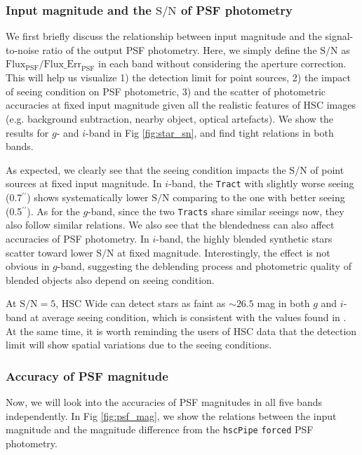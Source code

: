 \documentclass[useamsfonts]{pasj01}
\def\asec{$^{\prime\prime}$}
\def\hscpipe{\texttt{hscPipe}}
\def\forced{\texttt{forced}}
\def\tract{\texttt{Tract}}
\def\tracts{\texttt{Tracts}}
\def\s2n{{$\mathrm{S}/\mathrm{N}$}}
\begin{document}
\subsubsection{Input magnitude and the $\mathrm{S}/\mathrm{N}$ of PSF photometry}

    We first briefly discuss the relationship between input magnitude and the
    signal-to-noise ratio of the output PSF photometry.
    Here, we simply define the \s2n{} as
    $\mathrm{Flux}_{\mathrm{PSF}}/\mathrm{Flux\_Err}_{\mathrm{PSF}}$ in each band
    without considering the aperture correction.
    This will help us visualize
    1) the detection limit for point sources,
    2) the impact of seeing condition on PSF photometric,
    3) and the scatter of photometric accuracies at fixed input magnitude given all
       the realistic features of HSC images (e.g. background subtraction, nearby
       object, optical artefacts).
    We show the results for $g$- and $i$-band in Fig \ref{fig:star_sn}, and find tight
    relations in both bands.

    As expected, we clearly see that the seeing condition impacts the \s2n{} of point
    sources at fixed input magnitude.
    In $i$-band, the \tract{} with slightly worse seeing (0.7\asec{}) shows systematically
    lower \s2n{} comparing to the one with better seeing (0.5\asec{}).
    As for the $g$-band, since the two \tracts{} share similar seeings now, they also
    follow similar relations.
    We also see that the blendedness can also affect accuracies of PSF photometry.
    In $i$-band, the highly blended synthetic stars scatter toward lower \s2n{} at
    fixed magnitude.
    Interestingly, the effect is not obvious in $g$-band, suggesting the deblending
    process and photometric quality of blended objects also depend on seeing condition.

    At \s2n{}$=5$, HSC Wide can detect stars as faint as ${\sim}26.5$ mag in both $g$ and
    $i$-band at average seeing condition, which is consistent with the values found
    in \citet{HSCDR1}.
    At the same time, it is worth reminding the users of HSC data that the detection
    limit will show spatial variations due to the seeing conditions.

\subsubsection{Accuracy of PSF magnitude}

    Now, we will look into the accuracies of PSF magnitudes in all five bands
    independently.
    In Fig \ref{fig:psf_mag}, we show the relations between the input magnitude and the
    magnitude difference from the \hscpipe{} \forced{} PSF photometry.
\end{document}
